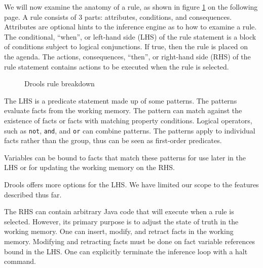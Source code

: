 We will now examine the anatomy of a rule, as shown in figure \ref{fig:Drools_Rule_Breakdown} on the following page.
A rule consists of 3 parts: attributes, conditions, and consequences.
Attributes are optional hints to the inference engine as to how to examine a rule.
The conditional, ``when'', or left-hand side (LHS) of the rule statement is a block of conditions subject to logical conjunctions. 
If true, then the rule is placed on the agenda.
The actions, consequences, ``then'', or right-hand side (RHS) of the rule statement contains actions to be executed when the rule is selected.

\begin{figure}[h]
    \centering
    \caption{Drools rule breakdown}
    \label{fig:Drools_Rule_Breakdown}
\end{figure}

The LHS is a predicate statement made up of some patterns.
The patterns evaluate facts from the working memory.
The pattern can match against the existence of facts or facts with matching property conditions.
Logical operators, such as \texttt{not}, \texttt{and}, and \texttt{or} can combine patterns.
The patterns apply to individual facts rather than the group, thus can be seen as first-order predicates.

Variables can be bound to facts that match these patterns for use later in the LHS or for updating the working memory on the RHS.

Drools offers more options for the LHS.
We have limited our scope to the features described thus far.

The RHS can contain arbitrary Java code that will execute when a rule is selected.
However, its primary purpose is to adjust the state of truth in the working memory.
One can insert, modify, and retract facts in the working memory.
Modifying and retracting facts must be done on fact variable references bound in the LHS.
One can explicitly terminate the inference loop with a halt command.


